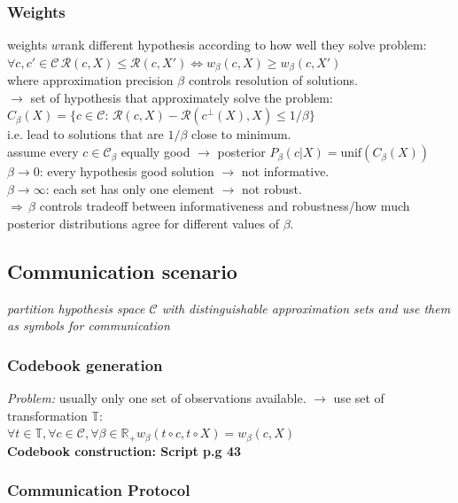 \documentclass[9pt,parskip]{scrartcl}
\begin{document}
\begin{multicols*}{4}
\subsubsection*{Weights}
weights $w$rank different hypothesis according to how well they solve problem: \\
$\forall c, c' \in \mathcal{C} \, \mathcal{R}(c,X) \leq \mathcal{R}(c,X') \Leftrightarrow w_{\beta}(c,X) \geq w_{\beta}(c,X')$ \\
where approximation precision $\beta$ controls resolution of solutions. \\
$\to$ set of hypothesis that approximately solve the problem: \\$C_{\beta}(X)= \{c \in \mathcal{C} : \, \mathcal{R} (c,X) - \mathcal{R}(c^{\bot}(X),X) \leq 1/\beta \}$ \\
i.e. lead to solutions that are $1/\beta$ close to minimum. \\
assume every $c \in \mathcal{C}_{\beta}$ equally good $\to$ posterior $P_{\beta}(c|X) = \text{unif}(C_{\beta}(X))$ \\
$\beta \to 0$: every hypothesis good solution $\to$ not informative. \\
$\beta \to \infty$: each set has only one element $\to$ not robust. \\
$ \Rightarrow \, \beta$ controls tradeoff between informativeness and robustness/how much posterior distributions agree for different values of $\beta$.

\subsection*{Communication scenario}
\textit{partition hypothesis space $\mathcal{C}$ with distinguishable approximation sets and use them as symbols for communication}
\subsubsection*{Codebook generation}
\textit{Problem:} usually only one set of observations available. $\to$ use set of transformation $\mathbb{T}$: \\
$\forall t \in \mathbb{T}, \forall c \in \mathcal{C}, \forall{\beta} \in \mathbb{R}_{+} w_{\beta}(t \circ c, t \circ X) = w_{\beta}(c,X)$ \\
\textbf{Codebook construction: Script p.g 43}


\subsubsection*{Communication Protocol}


\end{multicols*}
\end{document}
